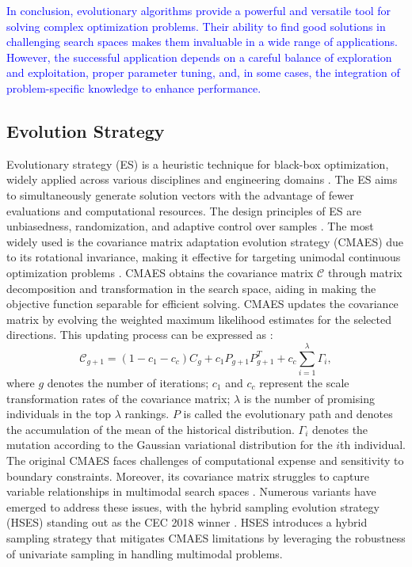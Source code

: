 \documentclass[journal,twoside]{IEEEtran}
\begin{document}
\textcolor{blue}{
In conclusion, evolutionary algorithms provide a powerful and versatile tool for solving complex optimization problems. Their ability to find good solutions in challenging search spaces makes them invaluable in a wide range of applications. However, the successful application depends on a careful balance of exploration and exploitation, proper parameter tuning, and, in some cases, the integration of problem-specific knowledge to enhance performance.}

\subsection{Evolution Strategy}
Evolutionary strategy (ES) is a heuristic technique for black-box optimization, widely applied across various disciplines and engineering domains \cite{10324315,10265195}. The ES aims to simultaneously generate solution vectors with the advantage of fewer evaluations and computational resources. The design principles of ES are unbiasedness, randomization, and adaptive control over samples \cite{10056413}. The most widely used is the covariance matrix adaptation evolution strategy (CMAES) due to its rotational invariance, making it effective for targeting unimodal continuous optimization problems \cite{hansen2001completely}. CMAES obtains the covariance matrix $\mathcal{C}$ through matrix decomposition and transformation in the search space, aiding in making the objective function separable for efficient solving. CMAES updates the covariance matrix by evolving the weighted maximum likelihood estimates for the selected directions. This updating process can be expressed as \cite{karmakar2023cma}:
\begin{equation}
	\mathcal{C}_{g+1} = (1 - c_1 - c_c)C_g + c_1P_{g+1}P^T_{g+1}+c_c\sum_{i = 1}^\lambda\Gamma_i,
\end{equation}
where $g$ denotes the number of iterations; $c_1$ and $c_c$ represent the scale transformation rates of the covariance matrix; $\lambda$ is the number of promising individuals in the top $\lambda$ rankings. $P$ is called the evolutionary path and denotes the accumulation of the mean of the historical distribution. $\Gamma_i$ denotes the mutation according to the Gaussian variational distribution for the $i$th individual. The original CMAES faces challenges of computational expense and sensitivity to boundary constraints. Moreover, its covariance matrix struggles to capture variable relationships in multimodal search spaces \cite{li2020variable}. Numerous variants have emerged to address these issues, with the hybrid sampling evolution strategy (HSES) standing out as the CEC 2018 winner \cite{zhang2018hybrid}. HSES introduces a hybrid sampling strategy that mitigates CMAES limitations by leveraging the robustness of univariate sampling in handling multimodal problems.
\end{document}
